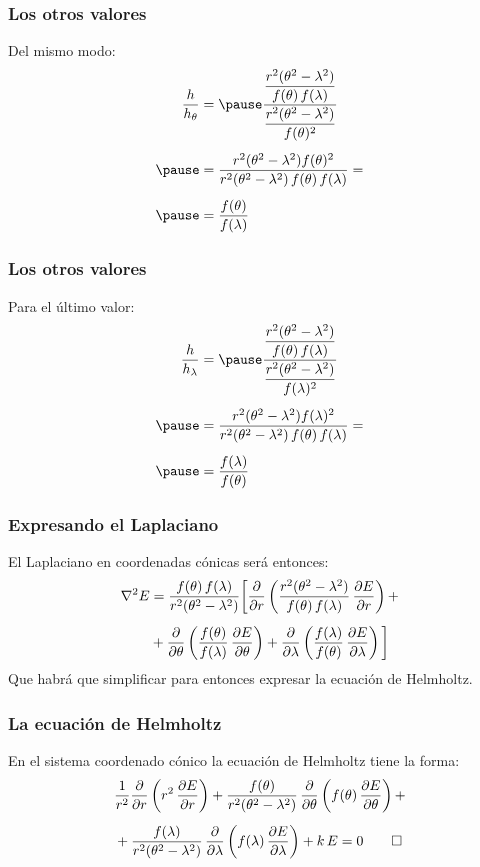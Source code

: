 \documentclass[12pt]{beamer}
\begin{document}
\begin{frame}
\frametitle{Los otros valores}
Del mismo modo:
\pause
\begin{eqnarray*}
\begin{aligned}
\dfrac{h}{h_{\theta}} &= \pause \dfrac{\dfrac{r^{2}(\theta^{2} - \lambda^{2})}{f(\theta) \, f(\lambda)}}{\dfrac{r^{2}(\theta^{2} - \lambda^{2})}{f(\theta)^{2}}} \\[0.5em] \pause
&= \dfrac{r^{2}(\theta^{2} - \lambda^{2}) f(\theta)^{2}}{r^{2}(\theta^{2} - \lambda^{2}) \, f(\theta) \, f(\lambda)} = \\[0.5em] \pause
&= \dfrac{f(\theta)}{f(\lambda)} 
\end{aligned}
\end{eqnarray*}
\end{frame}
\begin{frame}
\frametitle{Los otros valores}
Para el último valor:
\pause
\begin{eqnarray*}
\begin{aligned}
\dfrac{h}{h_{\lambda}} &= \pause \dfrac{\dfrac{r^{2}(\theta^{2} - \lambda^{2})}{f(\theta) \, f(\lambda)}}{\dfrac{r^{2}(\theta^{2} - \lambda^{2})}{f(\lambda)^{2}}} \\[0.5em] \pause
&= \dfrac{r^{2}(\theta^{2} - \lambda^{2}) f(\lambda)^{2}}{r^{2}(\theta^{2} - \lambda^{2}) \, f(\theta) \, f(\lambda)} = \\[0.5em] \pause
&= \dfrac{f(\lambda)}{f(\theta)} 
\end{aligned}
\end{eqnarray*}
\end{frame}
\begin{frame}
\frametitle{Expresando el Laplaciano}
El Laplaciano en coordenadas cónicas será entonces:
\pause
\begin{align*}
\laplacian{E} &= \dfrac{f(\theta) \, f(\lambda)}{r^{2} (\theta^{2} - \lambda^{2})} \bigg[ \pdv{r} \left( \dfrac{r^{2} (\theta^{2} - \lambda^{2})}{f(\theta) \, f(\lambda)} \, \pdv{E}{r} \right) + \\[0.5em]
&+ \pdv{\theta} \left( \dfrac{f(\theta)}{f(\lambda)} \, \pdv{E}{\theta} \right) + \pdv{\lambda} \left( \dfrac{f(\lambda)}{f(\theta)} \, \pdv{E}{\lambda} \right) \bigg]
\end{align*}
\pause
Que habrá que simplificar para entonces expresar la ecuación de Helmholtz.
\end{frame}
\begin{frame}
\frametitle{La ecuación de Helmholtz}
En el sistema coordenado cónico la ecuación de Helmholtz tiene la forma:
\pause
\begin{align*}
&\dfrac{1}{r^{2}} \pdv{r} \left( r^{2} \, \pdv{E}{r} \right) + \dfrac{f(\theta)}{r^{2} (\theta^{2} - \lambda^{2})} \, \pdv{\theta} \left( f(\theta) \, \pdv{E}{\theta} \right) + \\[0.5em]
&+ \dfrac{f(\lambda)}{r^{2} (\theta^{2} - \lambda^{2})} \, \pdv{\lambda} \left( f(\lambda) \, \pdv{E}{\lambda} \right) + k \, E = 0 \qed
\end{align*}
\end{frame}
\end{document}

